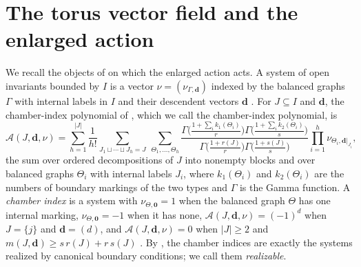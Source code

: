 \documentclass[11pt]{amsart}
\theoremstyle{definition}
\theoremstyle{remark}
\begin{document}
\section{The torus vector field and the enlarged action}
\label{sec:enlarged}

We recall the objects of \cite{GKT} on which the enlarged action acts.  A
system of open invariants bounded by $I$ is a vector
$\nu=(\nu_{\Gamma,\mathbf d})$ indexed by the balanced graphs $\Gamma$ with
internal labels in $I$ and their descendent vectors $\mathbf d$
\cite[(0.3)]{GKT}.  For $J\subseteq I$ and $\mathbf d$, the chamber-index
polynomial of \cite[Notation~3.42]{GKT}, which we call the chamber-index
polynomial, is
\begin{equation}
\label{eq:Apoly}
\mathcal A(J,\mathbf d,\nu)=\sum_{h=1}^{|J|}\frac1{h!}
\sum_{J_1\sqcup\cdots\sqcup J_h=J}\ \sum_{\Theta_1,\dots,\Theta_h}
\frac{\Gamma\bigl(\frac{1+\sum_i k_1(\Theta_i)}{r}\bigr)
      \Gamma\bigl(\frac{1+\sum_i k_2(\Theta_i)}{s}\bigr)}
     {\Gamma\bigl(\frac{1+r(J)}{r}\bigr)\Gamma\bigl(\frac{1+s(J)}{s}\bigr)}
\prod_{i=1}^h\nu_{\Theta_i,\mathbf d|_{J_i}},
\end{equation}
the sum over ordered decompositions of $J$ into nonempty blocks and over
balanced graphs $\Theta_i$ with internal labels $J_i$, where $k_1(\Theta_i)$
and $k_2(\Theta_i)$ are the numbers of boundary markings of the two types and
$\Gamma$ is the Gamma function.  A
\emph{chamber index} is a system with $\nu_{\Theta,\mathbf 0}=1$ when the
balanced graph $\Theta$ has one internal marking, $\nu_{\Theta,\mathbf 0}=-1$
when it has none,
$\mathcal A(J,\mathbf d,\nu)=(-1)^d$ when $J=\{j\}$ and $\mathbf d=(d)$, and
$\mathcal A(J,\mathbf d,\nu)=0$ when $|J|\ge2$ and
$m(J,\mathbf d)\ge s\,r(J)+r\,s(J)$ \cite[Definition~3.47]{GKT}.  By
\cite[Corollary~5.14]{GKT}, the chamber indices are exactly the systems
realized by canonical boundary conditions; we call them \emph{realizable}.
\end{document}
